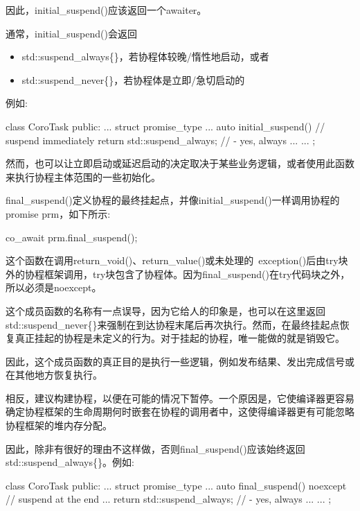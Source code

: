 因此，initial\_suspend()应该返回一个awaiter。

通常，initial\_suspend()会返回

\begin{itemize}
\item 
std::suspend\_always\{\}，若协程体较晚/惰性地启动，或者

\item
std::suspend\_never\{\}，若协程体是立即/急切启动的
\end{itemize}

例如:

\begin{cpp}
class CoroTask {
	public:
	...
	struct promise_type {
		...
		auto initial_suspend() { // suspend immediately
			return std::suspend_always{}; // - yes, always
		}
		...
	}
	...
};
\end{cpp}

然而，也可以让立即启动或延迟启动的决定取决于某些业务逻辑，或者使用此函数来执行协程主体范围的一些初始化。


final\_suspend()定义协程的最终挂起点，并像initial\_suspend()一样调用协程的promise prm，如下所示:

\begin{cpp}
co_await prm.final_suspend();
\end{cpp}

这个函数在调用return\_void()、return\_value()或未处理的\ exception()后由try块外的协程框架调用，try块包含了协程体。因为final\_suspend()在try代码块之外，所以必须是noexcept。

这个成员函数的名称有一点误导，因为它给人的印象是，也可以在这里返回std::suspend\_never\{\}来强制在到达协程末尾后再次执行。然而，在最终挂起点恢复真正挂起的协程是未定义的行为。对于挂起的协程，唯一能做的就是销毁它。

因此，这个成员函数的真正目的是执行一些逻辑，例如发布结果、发出完成信号或在其他地方恢复执行。

相反，建议构建协程，以便在可能的情况下暂停。一个原因是，它使编译器更容易确定协程框架的生命周期何时嵌套在协程的调用者中，这使得编译器更有可能忽略协程框架的堆内存分配。

因此，除非有很好的理由不这样做，否则final\_suspend()应该始终返回std::suspend\_always\{\}。例如:

\begin{cpp}
class CoroTask {
	public:
	...
	struct promise_type {
		...
		auto final_suspend() noexcept { // suspend at the end
			...
			return std::suspend_always{}; // - yes, always
		}
		...
	}
	...
};
\end{cpp}


